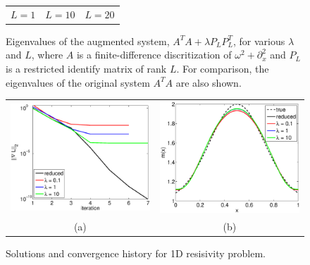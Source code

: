 \documentclass{iopart}
\begin{document}
\begin{figure}
\begin{tabular}{ccc}
{\small $L = 1$}&{\small $L = 10$}&{\small $L = 20$}\\
\end{tabular}
\caption{Eigenvalues of the augmented system,  $A^TA + \lambda P_LP_L^T$, for various $\lambda$ and $L$, where $A$ is a finite-difference discritization of $\omega^2 + \partial_x^2$
and $P_L$ is a restricted identify matrix of rank $L$. For comparison, the eigenvalues of the original system $A^TA$ are also shown.}
\label{fig:2D_example1}
\end{figure}

\begin{figure}
\centering
\begin{tabular}{cc}
\includegraphics[scale=.4]{./figs/1D_exp1_a}&
\includegraphics[scale=.4]{./figs/1D_exp1_b}\\
{\small (a)}&{\small (b)}\\
\end{tabular}
\caption{Solutions and convergence history for 1D resisivity problem.}
\label{fig:1D_exp1}
\end{figure}
\end{document}

